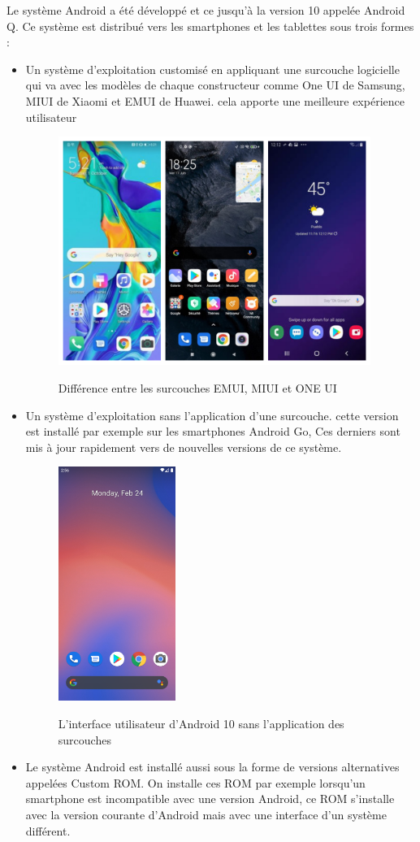 Le système Android a été développé et ce jusqu'à la version 10 appelée Android Q. Ce système est distribué vers les smartphones et les tablettes sous trois formes : 
\begin{itemize}
    \item Un système d'exploitation customisé en appliquant une surcouche logicielle qui va avec les modèles de chaque constructeur comme One UI de Samsung, MIUI de Xiaomi et EMUI de Huawei. cela apporte une meilleure expérience utilisateur
   
    \begin{figure}[!ht]
        \centering
        \includegraphics[width=4in]{images/Chapitre1/surcouche.jpg}
        \label{fig:surcouche}
        \caption{Différence entre les surcouches EMUI, MIUI et ONE UI}
    \end{figure}

    \item Un système d'exploitation sans  l'application d'une surcouche. cette version est installé par exemple sur les smartphones Android Go, Ces derniers sont mis à jour rapidement vers de nouvelles versions de ce système.
    \begin{figure}[!ht]
        \centering
        \includegraphics[width=1.5in]{images/Chapitre1/android_R.png}
        \label{fig:androidsanssurcouche}
        \caption{L'interface utilisateur d'Android 10 sans l'application des surcouches}
    \end{figure}
    \item Le système Android est installé aussi sous la forme de versions alternatives appelées Custom ROM. On installe ces ROM par exemple lorsqu'un smartphone est incompatible avec une version Android, ce ROM s'installe avec la version courante d'Android mais avec une interface d'un système différent.
\end{itemize}
